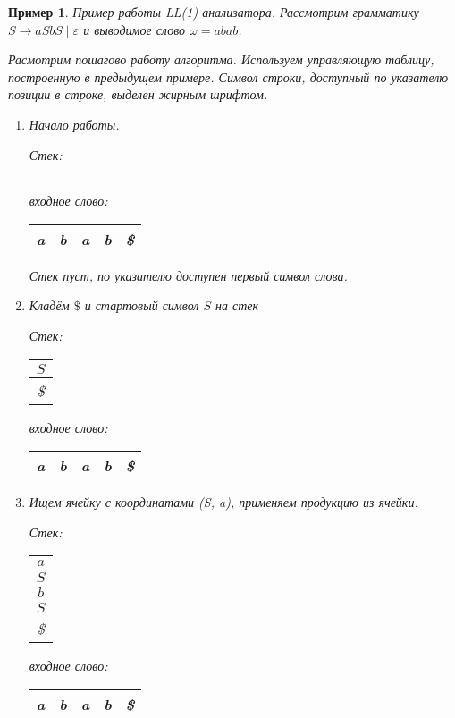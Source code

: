 \documentclass[10pt]{article}         %
\newtheorem{example}{Пример}
\begin{document}
	\begin{example}Пример работы LL(1) анализатора.
		Рассмотрим грамматику $S \to aSbS \mid \varepsilon$ и выводимое слово $\omega = abab$.
		
		Расмотрим пошагово работу алгоритма. Используем управляющую таблицу, построенную в предыдущем примере. Символ строки, доступный по указателю позиции в строке, выделен жирным шрифтом.
		
		
		\begin{enumerate}
			\item Начало работы.
			
			Стек: \,
			\begin{tabular}[c]{ |c| } 
				\\ \hline
			\end{tabular}  
			\qquad  \qquad \qquad  \qquad входное слово: \,
			\begin{tabular}[c]{ |c|c|c|c|c| } 
				\hline
				\textbf{a} & b & a & b & \$ \\ \hline
			\end{tabular}
			
			Стек пуст, по указателю доступен первый символ слова.
			
			\item Кладём $\$$ и стартовый символ $S$ на стек
			
			Стек: \,
			\begin{tabular}[c]{ |c| } 
				\\ \hline
				$S$ \\ \hline
				\$ \\ \hline
			\end{tabular}  
			\qquad  \qquad \qquad  \qquad входное слово: \,
			\begin{tabular}[c]{ |c|c|c|c|c| } 
				\hline
				\textbf{a} & b & a & b & \$ \\ \hline
			\end{tabular}
			
			\item Ищем ячейку с координатами (S, a), применяем продукцию из ячейки.
			
			Стек: \,
			\begin{tabular}[c]{ |c| } 
				\\ \hline
				$a$ \\ \hline
				$S$ \\ \hline
				$b$ \\ \hline
				$S$ \\ \hline
				\$ \\ \hline
			\end{tabular}  
			\qquad  \qquad \qquad  \qquad входное слово: \,
			\begin{tabular}[c]{ |c|c|c|c|c| } 
				\hline
				\textbf{a} & b & a & b & \$ \\ \hline
			\end{tabular}
			

\end{enumerate}
\end{example}
\end{document}
